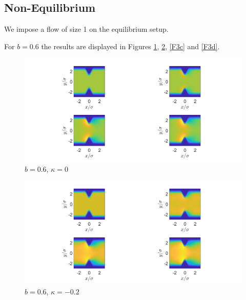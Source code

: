 \documentclass[11pt, a4paper]{article}
\theoremstyle{definition}
\begin{document}
\subsection{Non-Equilibrium}
We impose a flow of size 1 on the equilibrium setup.

For $b = 0.6$ the results are displayed in Figures \ref{F3a}, \ref{F3b}, \ref{F3c} and \ref{F3d}.
\begin{figure}[h]
	\centering
	\includegraphics[scale=0.4]{ConFa1.png}
	\caption{$b = 0.6$, $\kappa = 0$} 
	\label{F3a}
\end{figure}

\begin{figure}[h]
	\centering
	\includegraphics[scale=0.4]{ConFa2.png}
	\caption{$b = 0.6$, $\kappa = -0.2$} 
	\label{F3b}
\end{figure}
\end{document}
